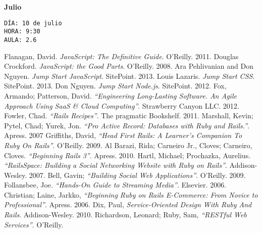 \documentclass[11pt,a4paper]{article}
\begin{document}
{\bf Julio}
\begin{verbatim}
DÍA: 10 de julio
HORA: 9:30
AULA: 2.6
\end{verbatim}
%

\begin{thebibliography}{99}

%

 Flanagan, David. \emph{JavaScript: The Definitive Guide}. O'Reilly. 2011.
 Douglas Crockford. \emph{JavaScript: the Good Parts}. O'Reilly. 2008.
 Ara Pehlivanian and Don Nguyen. \emph{Jump Start JavaScript}. SitePoint. 2013.
 Louis Lazaris. \emph{Jump Start CSS}. SitePoint. 2013.
 Don Nguyen. \emph{Jump Start Node.js}. SitePoint. 2012.
 Fox, Armando; Patterson, David. \emph{“Engineering Long-Lasting Software. An Agile Approach Using SaaS \& Cloud Computing”}. Strawberry Canyon LLC. 2012.
 Fowler, Chad. \emph{“Rails Recipes”}. The pragmatic Bookshelf. 2011.
 Marshall, Kevin; Pytel, Chad; Yurek, Jon. \emph{“Pro Active Record: Databases with Ruby and Rails.”}. Apress. 2007
 Griffiths, David, \emph{“Head First Rails: A Learner's Companion To Ruby On Rails”}. O’Reilly. 2009.
 Al Barazi, Rida; Carneiro Jr., Cloves; Carneiro, Cloves. \emph{“Beginning Rails 3”}. Apress. 2010.
 Hartl, Michael; Prochazka, Aurelius. \emph{“RailsSpace: Building a Social Networking Website with Ruby on Rails”}.  Addison-Wesley. 2007.
 Bell, Gavin; \emph{“Building Social Web Applications”}. O’Reilly. 2009.
 Follansbee, Joe. \emph{“Hands-On Guide to Streaming Media”}. Elsevier. 2006.
 Christian; Laine, Jarkko, \emph{“Beginning Ruby on Rails E-Commerce: From Novice to Professional”}. Apress. 2006.
 Dix, Paul, \emph{Service-Oriented Design With Ruby And Rails}. Addison-Wesley. 2010.
 Richardson, Leonard; Ruby, Sam, \emph{“RESTful Web Services”}. O’Reilly. 


\end{thebibliography}
\end{document}
